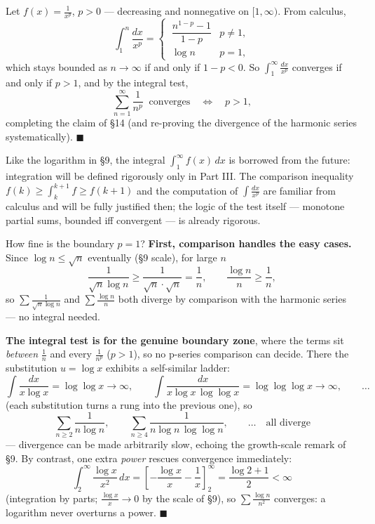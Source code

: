 \documentclass[11pt]{report}
\begin{document}
\begin{exbox}
Let $f(x) = \tfrac{1}{x^p}$, $p > 0$ --- decreasing and nonnegative on $[1,\infty)$. From calculus,
\[
\int_1^n \frac{dx}{x^p} =
\begin{cases}
\ \dfrac{n^{1-p} - 1}{1-p} & p \neq 1, \\[2mm]
\ \log n & p = 1,
\end{cases}
\]
which stays bounded as $n \to \infty$ if and only if $1 - p < 0$. So $\int_1^\infty \tfrac{dx}{x^p}$ converges if and only if $p > 1$, and by the integral test,
\[
\sum_{n=1}^\infty \frac{1}{n^p} \ \text{ converges} \quad \Longleftrightarrow \quad p > 1,
\]
completing the claim of \S 14 (and re-proving the divergence of the harmonic series systematically). \hfill $\blacksquare$
\end{exbox}

\begin{rembox}
Like the logarithm in \S 9, the integral $\int_1^\infty f(x)\,dx$ is borrowed from the future: integration will be defined rigorously only in Part III. The comparison inequality $f(k) \geq \int_k^{k+1} f \geq f(k+1)$ and the computation of $\int \tfrac{dx}{x^p}$ are familiar from calculus and will be fully justified then; the logic of the test itself --- monotone partial sums, bounded iff convergent --- is already rigorous.
\end{rembox}

\begin{exbox}
How fine is the boundary $p = 1$? \textbf{First, comparison handles the easy cases.} Since $\log n \leq \sqrt n$ eventually (\S 9 scale), for large $n$
\[
\frac{1}{\sqrt n \log n} \geq \frac{1}{\sqrt n \cdot \sqrt n} = \frac1n, \qquad \frac{\log n}{n} \geq \frac1n,
\]
so $\sum \tfrac{1}{\sqrt n \log n}$ and $\sum \tfrac{\log n}{n}$ both diverge by comparison with the harmonic series --- no integral needed.

\textbf{The integral test is for the genuine boundary zone}, where the terms sit \emph{between} $\tfrac1n$ and every $\tfrac{1}{n^p}$ ($p > 1$), so no p-series comparison can decide. There the substitution $u = \log x$ exhibits a self-similar ladder:
\[
\int \frac{dx}{x \log x} = \log\log x \to \infty, \qquad
\int \frac{dx}{x \log x \, \log\log x} = \log\log\log x \to \infty, \qquad \ldots
\]
(each substitution turns a rung into the previous one), so
\[
\sum_{n\geq2} \frac{1}{n \log n}, \qquad \sum_{n\geq4} \frac{1}{n \log n \, \log\log n}, \qquad \ldots \quad \text{all diverge}
\]
--- divergence can be made arbitrarily slow, echoing the growth-scale remark of \S 9. By contrast, one extra \emph{power} rescues convergence immediately:
\[
\int_2^\infty \frac{\log x}{x^2}\,dx = \left[ -\frac{\log x}{x} - \frac1x \right]_2^\infty = \frac{\log 2 + 1}{2} < \infty
\]
(integration by parts; $\tfrac{\log x}{x} \to 0$ by the scale of \S 9), so $\sum \tfrac{\log n}{n^2}$ converges: a logarithm never overturns a power. \hfill $\blacksquare$
\end{exbox}
\end{document}
